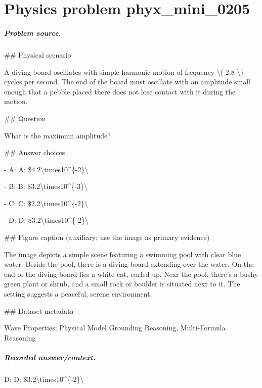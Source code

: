 
\chapter{Physics problem phyx\_mini\_0205}
\label{ch:PhyXMiniProblems_problem_phyx_mini_0205}

\paragraph{Problem source.}
\#\# Physical scenario

A diving board oscillates with simple harmonic motion of frequency \textbackslash{}( 2.8 \textbackslash{}) cycles per second. The end of the board must oscillate with an amplitude small enough that a pebble placed there does not lose contact with it during the motion.

\#\# Question

What is the maximum amplitude?

\#\# Answer choices

- A: A: \$4.2\textbackslash{}times10\textasciicircum{}\{-2\}\textbackslash{}

- B: B: \$3.2\textbackslash{}times10\textasciicircum{}\{-3\}\textbackslash{}

- C: C: \$2.2\textbackslash{}times10\textasciicircum{}\{-2\}\textbackslash{}

- D: D: \$3.2\textbackslash{}times10\textasciicircum{}\{-2\}\textbackslash{}

\#\# Figure caption (auxiliary; use the image as primary evidence)

The image depicts a simple scene featuring a swimming pool with clear blue water. Beside the pool, there is a diving board extending over the water. On the end of the diving board lies a white cat, curled up. Near the pool, there's a bushy green plant or shrub, and a small rock or boulder is situated next to it. The setting suggests a peaceful, serene environment.

\#\# Dataset metadata

Wave Properties; Physical Model Grounding Reasoning, Multi-Formula Reasoning

\paragraph{Recorded answer/context.}
D: D: \$3.2\textbackslash{}times10\textasciicircum{}\{-2\}\textbackslash{}

